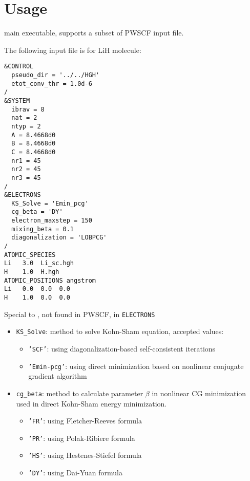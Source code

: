 \section{Usage}

\ffrLFDFT main executable, \ffrmain supports a subset of
PWSCF input file.

The following input file is for LiH molecule:
\begin{verbatim}
&CONTROL
  pseudo_dir = '../../HGH'
  etot_conv_thr = 1.0d-6
/
&SYSTEM
  ibrav = 8
  nat = 2
  ntyp = 2
  A = 8.4668d0
  B = 8.4668d0
  C = 8.4668d0
  nr1 = 45
  nr2 = 45
  nr3 = 45
/
&ELECTRONS
  KS_Solve = 'Emin_pcg'
  cg_beta = 'DY'
  electron_maxstep = 150
  mixing_beta = 0.1
  diagonalization = 'LOBPCG'
/
ATOMIC_SPECIES
Li   3.0  Li_sc.hgh
H    1.0  H.hgh
ATOMIC_POSITIONS angstrom
Li   0.0  0.0  0.0
H    1.0  0.0  0.0
\end{verbatim}

Special to \ffrLFDFT, not found in PWSCF, in {\tt ELECTRONS}
\begin{itemize}
\item {\tt KS\_Solve}: method to solve Kohn-Sham equation, accepted values:
\begin{itemize}
\item {\tt 'SCF'}: using diagonalization-based self-consistent iterations
\item {\tt 'Emin-pcg'}: using direct minimization based on nonlinear
conjugate gradient algorithm
\end{itemize}

\item {\tt cg\_beta}: method to calculate parameter $\beta$ in nonlinear CG minimization
used in direct Kohn-Sham energy minimization.
\begin{itemize}
\item {\tt 'FR'}: using Fletcher-Reeves formula
\item {\tt 'PR'}: using Polak-Ribiere formula
\item {\tt 'HS'}: using Hestenes-Stiefel formula
\item {\tt 'DY'}: using Dai-Yuan formula
\end{itemize}

\end{itemize}


